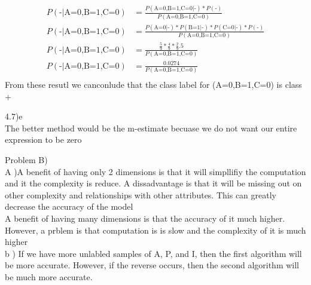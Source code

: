 \documentclass[12pt,english]{article}
\begin{document}
\begin{equation}
\begin{split}
P(\mbox{-} \vert \mbox{A=0,B=1,C=0}) &= \frac{P(\mbox{A=0,B=1,C=0} \vert \mbox{-}) * P(\mbox{-})}{P(\mbox{A=0,B=1,C=0})}\\
P(\mbox{-} \vert \mbox{A=0,B=1,C=0}) &= \frac{P(\mbox{A=0} \vert \mbox{-}) * P(\mbox{B=1} \vert \mbox{-}) *P(\mbox{C=0} \vert \mbox{-}) * P(\mbox{-})}{P(\mbox{A=0,B=1,C=0})}\\
P(\mbox{-} \vert \mbox{A=0,B=1,C=0}) &= \frac{\frac{5}{9} * \frac{4}{9} *\frac{2}{9} .5}{P(\mbox{A=0,B=1,C=0})}\\
P(\mbox{-} \vert \mbox{A=0,B=1,C=0}) &= \frac{0.0274}{P(\mbox{A=0,B=1,C=0})}\\
\end{split}
\end{equation}
From these resutl we canconlude that the class label for (A=0,B=1,C=0) is class +\\
\par
4.7)e\\
The better method would be the m-estimate becuase we do not want our entire expression to be zero\par
Problem B)\\
A )A benefit of having only 2 dimensions is that it will simpllifiy the computation and it the complexity is reduce. A dissadvantage is that it will be missing out on other complexity and relationships with other attributes. This can greatly decrease the accuracy of the model\\
A benefit of having many dimensions is that the accuracy of it much higher. However,  a prblem is that computation is is slow and the complexity of it is much higher\\
b ) If we have more unlabled samples of A, P, and I, then the first algorithm will be more accurate. However, if the reverse occurs, then the second algorithm will be much more accurate.
\end{document}

